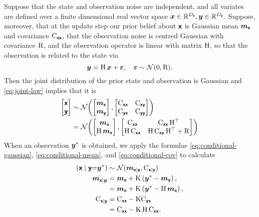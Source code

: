 \documentclass[wcp]{jmlr} %
\begin{document}
Suppose that the state and observation noise are independent, and all variates are defined over a finite dimensional real vector space
$\boldsymbol{x}\in\mathbb{R}^{D_{\boldsymbol{\mathsf{x}}}}, \boldsymbol{y}\in \mathbb{R}^{D_{\boldsymbol{\mathsf{y}}}}.$
Suppose, moreover, that at the update step our prior belief about $\boldsymbol{\mathsf{x}}$ is Gaussian mean \(\boldsymbol{m}_{\boldsymbol{\mathsf{x}}}\) and covariance \(\mathrm{C}_{\boldsymbol{\mathsf{xx}}}\), that the observation noise is centred Gaussian with covariance \(\mathrm{R}\), and the observation operator is linear with matrix \(\mathrm{H}\), so that the observation is related to the state via
\[
\boldsymbol{y} = \mathrm{H}\,\boldsymbol{x} + \boldsymbol{\varepsilon}, \quad \boldsymbol{\varepsilon} \sim \mathcal{N}(0,\mathrm{R}).
\]
Then the joint distribution of the prior state and observation is Gaussian and \eqref{eq:joint-law} implies that it is
\begin{align}
\begin{bmatrix}
\boldsymbol{\mathsf{x}} \\
\boldsymbol{\mathsf{y}}
\end{bmatrix}
&\sim \mathcal{N}\!\left(
    \begin{bmatrix}
    \boldsymbol{m}_{\boldsymbol{\mathsf{x}}} \\
    \boldsymbol{m}_{\boldsymbol{\mathsf{y}}}
    \end{bmatrix},
    \begin{bmatrix}
    \mathrm{C}_{\boldsymbol{\mathsf{xx}}} & \mathrm{C}_{\boldsymbol{\mathsf{xy}}} \\
    \mathrm{C}_{\boldsymbol{\mathsf{yx}}} & \mathrm{C}_{\boldsymbol{\mathsf{yy}}}
    \end{bmatrix}
    \right)\\
&=\mathcal{N}\!\left(
    \begin{bmatrix}
    \boldsymbol{m}_{\boldsymbol{\mathsf{x}}} \\
    \mathrm{H}\,\boldsymbol{m}_{\boldsymbol{\mathsf{x}}}
    \end{bmatrix},
    \begin{bmatrix}
    \mathrm{C}_{\boldsymbol{\mathsf{xx}}} & \mathrm{C}_{\boldsymbol{\mathsf{xx}}}\,\mathrm{H}^\top \\
    \mathrm{H}\,\mathrm{C}_{\boldsymbol{\mathsf{xx}}} & \mathrm{H}\,\mathrm{C}_{\boldsymbol{\mathsf{xx}}}\,\mathrm{H}^\top + \mathrm{R}
    \end{bmatrix}
    \right)
\end{align}
When an observation \(\boldsymbol{y}^*\) is obtained, we apply the formulae
\eqref{eq:conditional-gaussian}, \eqref{eq:conditional-mean}, and \eqref{eq:conditional-cov} to calculate
\begin{align}
\left(\boldsymbol{\mathsf{x}} \mid \boldsymbol{\mathsf{y}} {=} \boldsymbol{y}^*\right)
&\sim\mathcal{N}(\boldsymbol{m}_{\boldsymbol{\mathsf{x}}\mid\boldsymbol{\mathsf{y}}}, \mathrm{C}_{\boldsymbol{\mathsf{x}}\mid\boldsymbol{\mathsf{y}}})\\
\boldsymbol{m}_{\boldsymbol{\mathsf{x}}\mid \boldsymbol{y}}
&= \boldsymbol{m}_{\boldsymbol{\mathsf{x}}} + \mathrm{K} \left(\boldsymbol{y}^* - \boldsymbol{m}_{\boldsymbol{\mathsf{y}}}\right),\\
&= \boldsymbol{m}_{\boldsymbol{\mathsf{x}}} + \mathrm{K} \left(\boldsymbol{y}^* - \mathrm{H}\,\boldsymbol{m}_{\boldsymbol{\mathsf{x}}}\right),\\
\mathrm{C}_{\boldsymbol{\mathsf{x}}\mid\boldsymbol{\mathsf{y}}}
&= \mathrm{C}_{\boldsymbol{\mathsf{xx}}} - \mathrm{K}\mathrm{C}_{\boldsymbol{\mathsf{yx}}}\\
&= \mathrm{C}_{\boldsymbol{\mathsf{xx}}} - \mathrm{K}\,\mathrm{H}\,\mathrm{C}_{\boldsymbol{\mathsf{xx}}}.
\end{align}
\end{document}
